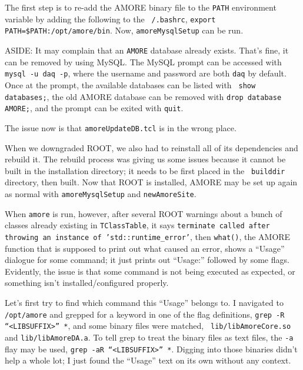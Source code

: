 \documentclass[12pt]{article}
\begin{document}
\qq The first step is to re-add the AMORE binary file to the {\tt PATH}
environment variable by adding the following to the {\tt ~/.bashrc}, {\tt export
  PATH=\$PATH:/opt/amore/bin}. Now, {\tt amoreMysqlSetup} can be run. 

\qq ASIDE: It may complain that an {\tt AMORE} database already exists. That's fine, it
can be removed by using MySQL. The MySQL prompt can be accessed with {\tt mysql
  -u daq -p}, where the username and password are both {\tt daq} by
default. Once at the prompt, the available databases can be listed with {\tt
  show databases;}, the old AMORE database can be removed with {\tt drop
  database AMORE;}, and the prompt can be exited with {\tt quit}.

\qq The issue now is that {\tt amoreUpdateDB.tcl} is in the wrong place.

\qq When we downgraded ROOT, we also had to reinstall all of its dependencies
and rebuild it. The rebuild process was giving us some issues because it cannot
be built in the installation directory; it needs to be first placed in the {\tt
  builddir} directory, then built. Now that ROOT is installed, AMORE may be set
up again as normal with {\tt amoreMysqlSetup} and {\tt newAmoreSite}.

\qq When {\tt amore} is run, however, after several ROOT warnings about a bunch
of classes already existing in {\tt TClassTable}, it says {\tt terminate called
  after throwing an instance of 'std::runtime_error'}, then {\tt what()}, the
AMORE function that is supposed to print out what caused an error, shows a
``Usage'' dialogue for some command; it just prints out ``Usage:'' followed by
some flags. Evidently, the issue is that some command
is not being executed as expected, or something isn't installed/configured
properly.

\qq Let's first try to find which command this ``Usage'' belongs to. I navigated
to {\tt /opt/amore} and grepped for a keyword in one of the flag definitions,
{\tt grep -R ``<LIBSUFFIX>'' *}, and some binary files were matched, {\tt
  lib/libAmoreCore.so} and {\tt lib/libAmoreDA.a}. To tell grep to treat the
binary files as text files, the {\tt -a} flay may be used, {\tt grep -aR
  ``<LIBSUFFIX>'' *}. Digging into those binaries didn't help a whole lot; I
just found the ``Usage'' text on its own without any context.

\end{document}
